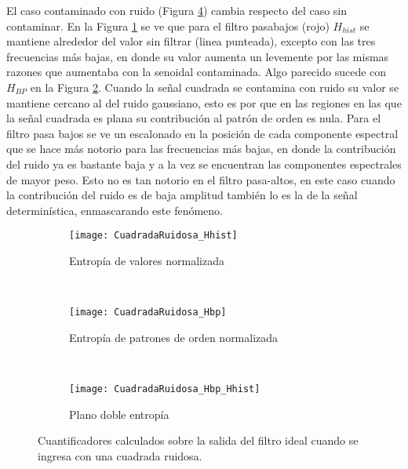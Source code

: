 El caso contaminado con ruido (Figura \ref{fig:CuadradaRuidosa}) cambia respecto del caso sin contaminar.
En la Figura \ref{subfig:CuadradaRuidosa_Hhist} se ve que para el filtro pasabajos (rojo) $H_{hist}$ se mantiene alrededor del valor sin filtrar (linea punteada), excepto con las tres frecuencias más bajas, en donde su valor aumenta un levemente por las mismas razones que aumentaba con la senoidal contaminada.
Algo parecido sucede con $H_{BP}$ en la Figura \ref{subfig:CuadradaRuidosa_Hbp}.
Cuando la señal cuadrada se contamina con ruido su valor se mantiene cercano al del ruido gaussiano, esto es por que en las regiones en las que la señal cuadrada es plana su contribución al patrón de orden es nula.
Para el filtro pasa bajos se ve un escalonado en la posición de cada componente espectral que se hace más notorio para las frecuencias más bajas, en donde la contribución del ruido ya es bastante baja y a la vez se encuentran las componentes espectrales de mayor peso.
Esto no es tan notorio en el filtro pasa-altos, en este caso cuando la contribución del ruido es de baja amplitud también lo es la de la señal determinística, enmascarando este fenómeno.
%
\begin{figure}[h]
    \centering
    \begin{subfigure}[t]{.49\textwidth}
        \texttt{[image: CuadradaRuidosa\_Hhist]}
        \caption{Entropía de valores normalizada}
        \label{subfig:CuadradaRuidosa_Hhist}
    \end{subfigure}
    ~ %
    \begin{subfigure}[t]{.49\textwidth}
        \texttt{[image: CuadradaRuidosa\_Hbp]}
        \caption{Entropía de patrones de orden normalizada}
        \label{subfig:CuadradaRuidosa_Hbp}
    \end{subfigure}
    ~ %
    \begin{subfigure}[t]{.49\textwidth}
        \texttt{[image: CuadradaRuidosa\_Hbp\_Hhist]}
        \caption{Plano doble entropía}
        \label{subfig:CuadradaRuidosa_HbpHhist}
    \end{subfigure}
    \caption{Cuantificadores calculados sobre la salida del filtro ideal cuando se ingresa con una cuadrada ruidosa.}\label{fig:CuadradaRuidosa}
\end{figure}

